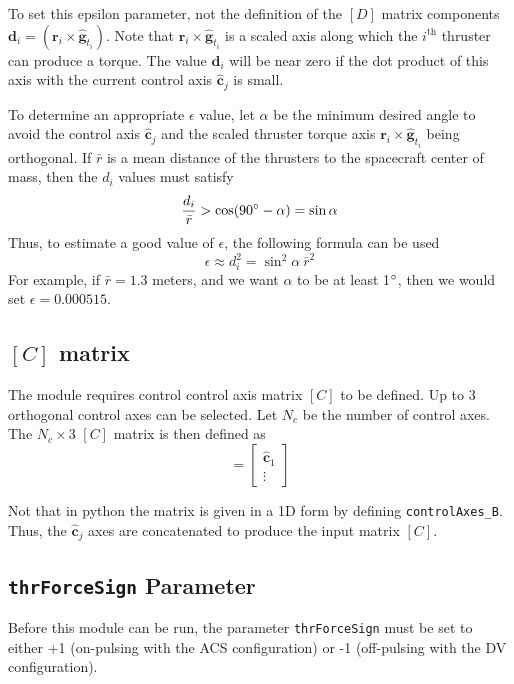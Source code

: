 \documentclass[]{BasiliskReportMemo}
\begin{document}
To set this epsilon parameter, not the definition of the $[D]$ matrix components $\bm d_{i} = (\bm r_{i} \times \hat{\bm g}_{t_{i}})$. Note that $\bm r_{i} \times \hat{\bm g}_{t_{i}}$ is a scaled axis along which the $i^{\text{th}}$ thruster can produce a torque.  The value $\bm d_{i}$ will be near zero if the dot product of this axis with the current control axis $\hat{\bm c}_{j}$ is small.  

To determine an appropriate $\epsilon$ value, let $\alpha$ be the minimum desired angle to avoid the control axis $\hat{\bm c}_{j}$ and the scaled thruster torque axis $\bm r_{i} \times \hat{\bm g}_{t_{i}}$ being orthogonal.  If $\bar r$ is a mean distance of the thrusters to the spacecraft center of mass, then the $d_{i}$ values must satisfy
\begin{equation}
	\frac{d_{i}}{\bar r} > \cos(90\dg - \alpha) = \sin\alpha
\end{equation}
Thus, to estimate a good value of $\epsilon$, the following formula can be used
\begin{equation}
	\epsilon \approx d_{i}^{2} = \sin^{2}\!\alpha \ \bar{r}^{2}
\end{equation}
For example, if $\bar{r} = 1.3$ meters, and we want $\alpha$ to be at least 1$\dg$, then we would set $\epsilon = 0.000515$.

\subsection{$[C]$ matrix}
The module requires control control axis matrix $[C]$ to be defined.  Up to 3 orthogonal control axes can be selected.  Let $N_{c}$ be the number of control axes.  The $N_{c}\times 3$ $[C]$ matrix is then defined as
\begin{equation}
	[C] = \begin{bmatrix}
		\hat{\bm c}_{1}
		\\
		\vdots
	\end{bmatrix}
\end{equation}

Not that in python the matrix is given in a 1D form by defining {\tt controlAxes\_B}.  Thus, the $\hat{\bm c}_{j}$ axes are concatenated to produce the input matrix $[C]$. 

\subsection{{\tt thrForceSign} Parameter}
Before this module can be run, the parameter {\tt thrForceSign} must be set to either +1 (on-pulsing with the ACS configuration) or -1 (off-pulsing with the DV configuration).




\end{document}
